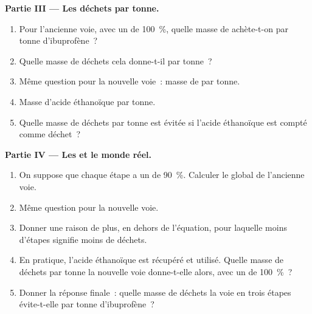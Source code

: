 \begin{problem}
\medskip
\noindent\textbf{Partie III --- Les déchets par tonne.}
\begin{enumerate}[resume]
  \item Pour l'ancienne voie, avec un  de \qty{100}{\percent},
        quelle masse de  achète-t-on par tonne d'ibuprofène~?
  \item Quelle masse de déchets cela donne-t-il par tonne~?
  \item Même question pour la nouvelle voie~: masse de  par
        tonne.
  \item Masse d'acide éthanoïque par tonne.
  \item Quelle masse de déchets par tonne est évitée si l'acide
        éthanoïque est compté comme déchet~?
\end{enumerate}

\medskip
\noindent\textbf{Partie IV --- Les  et le monde réel.}
\begin{enumerate}[resume]
  \item On suppose que chaque étape a un  de
        \qty{90}{\percent}.
        Calculer le  global de l'ancienne voie.
  \item Même question pour la nouvelle voie.
  \item Donner une raison de plus, en dehors de l'équation, pour laquelle
        moins d'étapes signifie moins de déchets.
  \item En pratique, l'acide éthanoïque est récupéré et utilisé. Quelle
        masse de déchets par tonne la nouvelle voie donne-t-elle alors,
        avec un  de
        \qty{100}{\percent}~?
  \item Donner la réponse finale~: quelle masse de déchets la voie en
        trois étapes évite-t-elle par tonne d'ibuprofène~?
\end{enumerate}
\end{problem}
